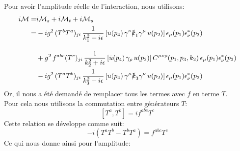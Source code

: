 \documentclass[12pt, a4paper]{article}
\begin{document}
 	Pour avoir l'amplitude réelle de l'interaction, nous utilisons:
 	\begin{equation}
 		\begin{split}
 			i\mathcal{M}=
 			&i\mathcal{M}_s + i\mathcal{M}_t + i\mathcal{M}_u \\
 			=& -i g^2 \, (T^b T^a)_{ji} \, \frac{1}{k_1^2+ i\epsilon} \left[ \bar{u}(p_4) \, \gamma^\nu \slashed{k}_1 \gamma^\mu \, u(p_2) \right] \epsilon_\mu(p_1) \epsilon_\nu^*(p_3) \\[1em]
 			 &+ g^2 \, f^{abc} (T^c)_{ji} \, \frac{1}{k_2^2+ i\epsilon} \left[ \bar{u}(p_4) \, \gamma_\rho \, u(p_2) \right] C^{\mu\nu\rho}(p_1, p_3, k_2) \, \epsilon_\mu(p_1) \epsilon_\nu^*(p_3) \\
 			 & -i g^2 \, (T^a T^b)_{ji} \, \frac{1}{k_3^2+ i\epsilon} \left[ \bar{u}(p_4) \, \gamma^\mu \slashed{k}_3 \gamma^\nu \, u(p_2) \right] \epsilon_\mu(p_1) \epsilon_\nu^*(p_3)
 		\end{split}
 	\end{equation}
 	Or, il nous a été demandé de remplacer tous les termes avec $f$ en terme $T$.\\
 	Pour cela nous utilisons la commutation entre générateurs $T$:
 	\[[T^a,T^b]=if^{abc} T^c\]
 	Cette relation se développe comme suit:
 	\[-i(T^a T^b - T^b T^a) = f^{abc} T^c \]
 	Ce qui nous donne ainsi pour l'amplitude:
\end{document}
